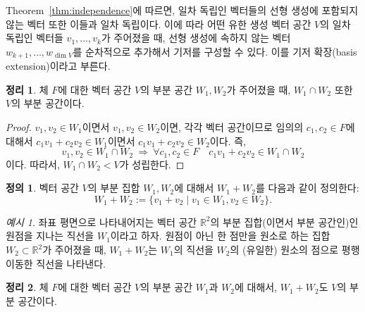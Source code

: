 \documentclass[unfonts,oneside,a4paper]{oblivoir}
\theoremstyle{definition}
\newtheorem{definition}{정의}
\theoremstyle{theorem}
\newtheorem{theorem}{정리}
\theoremstyle{remark}
\theoremstyle{remark}
\theoremstyle{remark}
\newtheorem*{example}{예시}
\theoremstyle{remark}
\renewcommand{\vec}[1]{\bm{\mathit{#1}}}
\begin{document}
Theorem~\ref{thm:independence}에 따르면, 일차 독립인 벡터들의 선형 생성에 포함되지 않는 벡터 또한 이들과 일차 독립이다.
이에 따라 어떤 유한 생성 벡터 공간 $V$의 일차 독립인 벡터들 $\vec v_1, \dots, \vec v_k$가 주어졌을 때, 선형 생성에 속하지 않는 벡터 $\vec w_{k + 1}, \dots, \vec w_{\dim V}$를 순차적으로 추가해서 기저를 구성할 수 있다.
이를 기저 확장(basis extension)이라고 부른다.

\begin{theorem} \label{thm:intersection}
    체 $F$에 대한 벡터 공간 $V$의 부분 공간 $W_1, W_2$가 주어졌을 때, $W_1 \cap W_2$ 또한 $V$의 부분 공간이다.
\end{theorem}

\begin{proof}
    $\vec v_1, \vec v_2 \in W_1$이면서 $\vec v_1, \vec v_2 \in W_2$이면, 각각 벡터 공간이므로 임의의 $c_1, c_2 \in F$에 대해서 $c_1 \vec v_1 + c_2 \vec v_2 \in W_1$이면서 $c_1 \vec v_1 + c_2 \vec v_2 \in W_2$이다.
    즉,
    \[
        \vec v_1, \vec v_2 \in W_1 \cap W_2\ \Rightarrow\ \forall c_1, c_2 \in F \quad c_1 \vec v_1 + c_2 \vec v_2 \in W_1 \cap W_2
    \]
    이다.
    따라서, $W_1 \cap W_2 < V$가 성립한다.
\end{proof}

\begin{definition}
    벡터 공간 $V$의 부분 집합 $W_1, W_2$에 대해서 $W_1 + W_2$를 다음과 같이 정의한다:
    \[
        W_1 + W_2 := \{\vec v_1 + \vec v_2 \mid \vec v_1 \in W_1, \vec v_2 \in W_2\}.
    \]
\end{definition}

\begin{example}
    좌표 평면으로 나타내어지는 벡터 공간 $\mathbb R^2$의 부분 집합(이면서 부분 공간인)인 원점을 지나는 직선을 $W_1$이라고 하자.
    원점이 아닌 한 점만을 원소로 하는 집합 $W_2 \subset \mathbb R^2$가 주어졌을 때, $W_1 + W_2$는 $W_1$의 직선을 $W_2$의 (유일한) 원소의 점으로 평행 이동한 직선을 나타낸다.
\end{example}

\begin{theorem} \label{thm:addition}
    체 $F$에 대한 벡터 공간 $V$의 부분 공간 $W_1$과 $W_2$에 대해서, $W_1 + W_2$도 $V$의 부분 공간이다.
\end{theorem}
\end{document}
